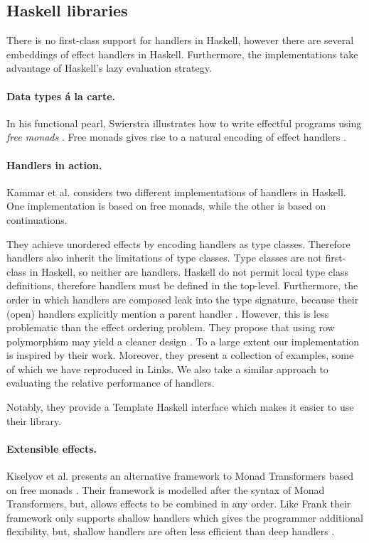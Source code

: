 \subsection{Haskell libraries}
There is no first-class support for handlers in Haskell, however there are several embeddings of effect handlers in Haskell. Furthermore, the implementations take advantage of Haskell's lazy evaluation strategy.

\paragraph{Data types á la carte.}
In his functional pearl, Swierstra illustrates how to write effectful programs using \emph{free monads} \cite{Swierstra2008}. Free monads gives rise to a natural encoding of effect handlers \cite{McBride2014}.

\paragraph{Handlers in action.}
Kammar et al. \cite{Kammar2013} considers two different implementations of handlers in Haskell. One implementation is based on free monads, while the other is based on continuations.

They achieve unordered effects by encoding handlers as type classes. Therefore handlers also inherit the limitations of type classes. Type classes are not first-class in Haskell, so neither are handlers. Haskell do not permit local type class definitions, therefore handlers must be defined in the top-level.
Furthermore, the order in which handlers are composed leak into the type signature, because their (open) handlers explicitly mention a parent handler \cite{Kammar2013}. However, this is less problematic than the effect ordering problem. They propose that using row polymorphism may yield a cleaner design \cite{Kammar2013}. To a large extent our implementation is inspired by their work. Moreover, they present a collection of examples, some of which we have reproduced in Links. We also take a similar approach to evaluating the relative performance of handlers. 

Notably, they provide a Template Haskell interface which makes it easier to use their library.

\paragraph{Extensible effects.}
Kiselyov et al. presents an alternative framework to Monad Transformers based on free monads \cite{Kiselyov2013}. Their framework is modelled after the syntax of Monad Transformers, but, allows effects to be combined in any order. Like Frank their framework only supports shallow handlers which gives the programmer additional flexibility, but, shallow handlers are often less efficient than deep handlers \cite{Kiselyov2013}.

